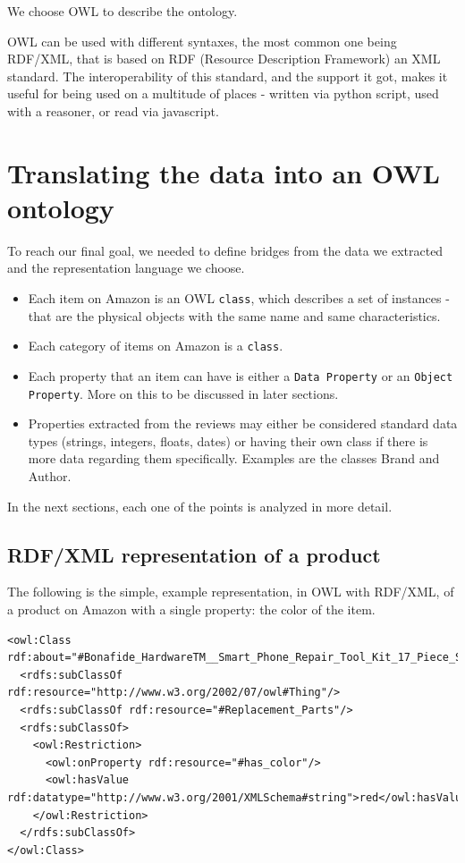 \documentclass[LaM,binding=0.6cm]{sapthesis}
\begin{document}
We choose OWL to describe the ontology. 

OWL can be used with different syntaxes, the most common one being RDF/XML, that is based on RDF (Resource Description Framework) an XML standard. The interoperability of this standard, and the support it got, makes it useful for being used on a multitude of places - written via python script, used with a reasoner, or read via javascript. 

\section{Translating the data into an OWL ontology}

To reach our final goal, we needed to define bridges from the data we extracted and the representation language we choose. \\

\begin{itemize}
\item Each item on Amazon is an OWL \texttt{class}, which describes a set of instances - that are the physical objects with the same name and same characteristics.
\item Each category of items on Amazon is a \texttt{class}.
\item Each property that an item can have is either a \texttt{Data Property} or an \texttt{Object Property}. More on this to be discussed in later sections.
\item Properties extracted from the reviews may either be considered standard data types (strings, integers, floats, dates) or having their own class if there is more data regarding them specifically. Examples are the classes Brand and Author.
\end{itemize}

In the next sections, each one of the points is analyzed in more detail.

\subsection{RDF/XML representation of a product}

The following is the simple, example representation, in OWL with RDF/XML, of a product on Amazon with a single property: the color of the item.

\bigskip

\begin{lstlisting}[language=owl]
<owl:Class rdf:about="#Bonafide_HardwareTM__Smart_Phone_Repair_Tool_Kit_17_Piece_Set_Screw_Driver_Torx_Pentalobe_Cell_Tools">
  <rdfs:subClassOf rdf:resource="http://www.w3.org/2002/07/owl#Thing"/>
  <rdfs:subClassOf rdf:resource="#Replacement_Parts"/>
  <rdfs:subClassOf>
    <owl:Restriction>
      <owl:onProperty rdf:resource="#has_color"/>
      <owl:hasValue rdf:datatype="http://www.w3.org/2001/XMLSchema#string">red</owl:hasValue>
    </owl:Restriction>
  </rdfs:subClassOf>
</owl:Class>
\end{lstlisting}
\end{document}
